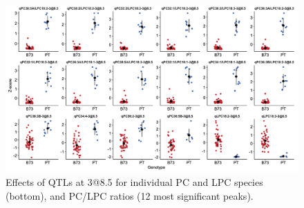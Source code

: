 \documentclass[9pt,twocolumn,twoside,lineno]{BioRxiv}
\begin{document}
\clearpage

\begin{figure}[t]
\begin{center}
\includegraphics[width=0.9\paperwidth]{Sup_Figures/Sup_Fig_2.png}
\caption{Effects of QTLs at 3@8.5 for individual PC and LPC species (bottom), and PC/LPC ratios (12 most significant peaks).
}

\label{SupFig2}
\end{center}
\end{figure} 

\clearpage
\end{document}
